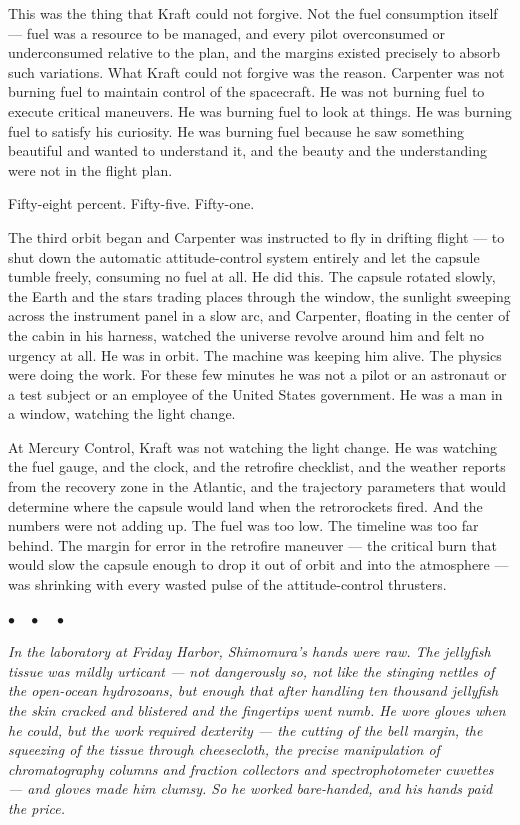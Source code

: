 \documentclass[12pt, letterpaper]{article}
\begin{document}
This was the thing that Kraft could not forgive. Not the fuel consumption itself --- fuel was a resource to be managed, and every pilot overconsumed or underconsumed relative to the plan, and the margins existed precisely to absorb such variations. What Kraft could not forgive was the reason. Carpenter was not burning fuel to maintain control of the spacecraft. He was not burning fuel to execute critical maneuvers. He was burning fuel to look at things. He was burning fuel to satisfy his curiosity. He was burning fuel because he saw something beautiful and wanted to understand it, and the beauty and the understanding were not in the flight plan.

Fifty-eight percent. Fifty-five. Fifty-one.

The third orbit began and Carpenter was instructed to fly in drifting flight --- to shut down the automatic attitude-control system entirely and let the capsule tumble freely, consuming no fuel at all. He did this. The capsule rotated slowly, the Earth and the stars trading places through the window, the sunlight sweeping across the instrument panel in a slow arc, and Carpenter, floating in the center of the cabin in his harness, watched the universe revolve around him and felt no urgency at all. He was in orbit. The machine was keeping him alive. The physics were doing the work. For these few minutes he was not a pilot or an astronaut or a test subject or an employee of the United States government. He was a man in a window, watching the light change.

At Mercury Control, Kraft was not watching the light change. He was watching the fuel gauge, and the clock, and the retrofire checklist, and the weather reports from the recovery zone in the Atlantic, and the trajectory parameters that would determine where the capsule would land when the retrorockets fired. And the numbers were not adding up. The fuel was too low. The timeline was too far behind. The margin for error in the retrofire maneuver --- the critical burn that would slow the capsule enough to drop it out of orbit and into the atmosphere --- was shrinking with every wasted pulse of the attitude-control thrusters.

\begin{center}
$\bullet\quad\bullet\quad\bullet$
\end{center}

\emph{In the laboratory at Friday Harbor, Shimomura's hands were raw. The jellyfish tissue was mildly urticant --- not dangerously so, not like the stinging nettles of the open-ocean hydrozoans, but enough that after handling ten thousand jellyfish the skin cracked and blistered and the fingertips went numb. He wore gloves when he could, but the work required dexterity --- the cutting of the bell margin, the squeezing of the tissue through cheesecloth, the precise manipulation of chromatography columns and fraction collectors and spectrophotometer cuvettes --- and gloves made him clumsy. So he worked bare-handed, and his hands paid the price.}
\end{document}
